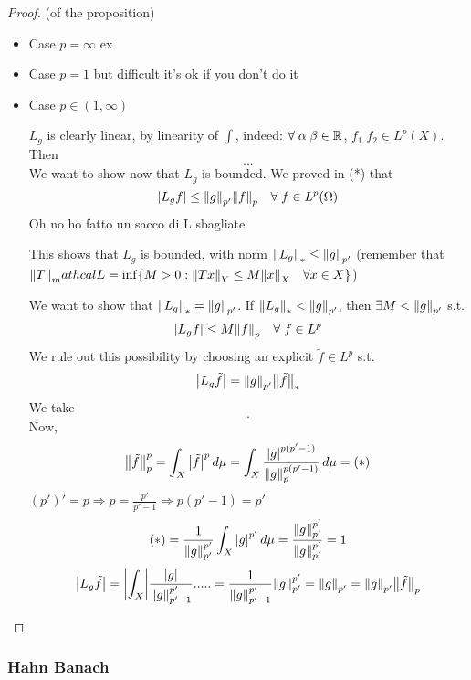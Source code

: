\begin{proof}
    (of the proposition)
    \begin{itemize}
        \item Case \(p=\infty\) ex
        \item Case \(p=1\) but difficult it's ok if you don't do it
        \item Case \(p \in (1, \infty)\)
        
        \(L_g\) is clearly linear, by linearity of \(\int\), indeed:
        \(\forall \; \alpha \; \beta \in \mathbb{R}\), \(f_1 \; f_2 \in L^p(X)\). Then
        \[
            ...
        \]
        We want to show now that \(L_g \) is bounded. 
        We proved in (*) that 
        \[
            \abs{L_g f} \leq \norm{g}_{p'} \norm{f}_p \quad \forall \; f \in L^p(\Omega)
        \]
        Oh no ho fatto un sacco di L sbagliate

        This shows that \(L_g\) is bounded, with norm  \(\norm{L_g}_* \leq \norm{g}_{p'}\) (remember that \(\norm{T}_mathcal{L} = \inf \{ M>0: \norm{Tx} _Y \leq M \norm{x}_X \quad \forall x \in X\} \))

        We want to show that \(\norm{L_g}_* = \norm{g}_{p'}\). If \(\norm{L_g}_* < \norm{g}_{p'}\), then \(\exists M < \norm{g}_{p'}\) s.t. 
        \[
            \abs{L_g f } \leq M \norm{f}_p \quad \forall \; f \in L^p
        \]
        We rule out this possibility by choosing an explicit \(\tilde{f} \in L^p \) s.t.
        \[
            \abs{L_g \tilde{f} } = \norm{g}_{p'} \norm{\tilde{f}}_*
        \]
        We take 
        \[
            .
        \]
        Now, 
        \[
            \norm{\tilde{f}}_p^p = \int_X \abs{\tilde{f}}^p \, d\mu = \int_X \frac{\abs{g}^{p(p'-1)}}{\norm{g}_p^{p(p'-1)}} \, d\mu = (*)
        \]
        \((p')' = p \Rightarrow p=\frac{p'}{p'-1} \Rightarrow p(p'-1) = p'\)
        \[
            (*) = \frac{1}{\norm{g}_{p'}^{p'}} \int_X \abs{g}^{p'} \, d\mu = \frac{\norm{g}_{p'}^{p'}}{\norm{g}_{p'}^{p'}} = 1
        \]    
        \[
            \abs{L_g \tilde{f}} = \abs{\int_X} \frac{\abs{g}}{\norm{g}_{p'-1}^{p'}} .....
            = \frac{1}{\norm{g}_{p'-1}^{p'}} \norm{g}_{p'}^{p'} = \norm{g}_{p'} = \norm{g}_{p'}\norm{\tilde{f}}_p
        \]
    \end{itemize}
\end{proof}

\subsubsection*{Hahn Banach}

